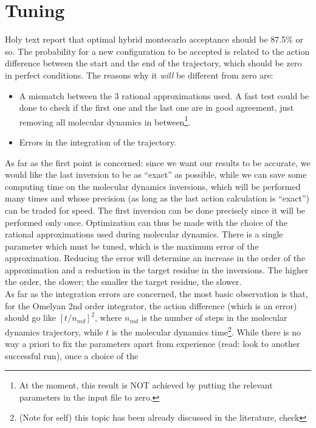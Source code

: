 \section{Tuning}
\label{tuning}
Holy text report that optimal hybrid montecarlo acceptance should be 87.5\% or 
so. 
The probability for a new configuration to be accepted is related to the action 
difference between the start and the end of the trajectory, which should be zero 
in 
perfect conditions. The reasons why it \emph{will} be different from zero are:
\begin{itemize}
    \item A mismatch between the 3 rational approximations used. A fast test could 
        be done 
        to check if the first one and the last one are in good agreement, just removing 
        all 
        molecular dynamics in between\footnote{At the moment, this result is NOT 
            achieved by 
        putting the relevant parameters in the input file to zero.}. 
    \item Errors in the integration of the trajectory.
\end{itemize}
As far as the first point is concerned: since we want our results to be 
accurate, we 
would like the last inversion to be as 
``exact'' as possible, while we can save some computing time on the molecular 
dynamics 
inversions, which will be performed many times and whose precision (as long as 
the last 
action calculation is ``exact'') can be traded for speed. The first inversion 
can be 
done precisely since it will be performed only once. Optimization can thus be 
made with
the choice of the rational approximations used during molecular dynamics. There 
is a 
single parameter which must be tuned, which is the maximum error of the 
approximation. 
Reducing the error will determine an increase in the order of the approximation 
and a 
reduction in the target residue in the inversions. The higher the order, the 
slower; 
the smaller the target residue, the slower. \\
As far as the integration errors are concerned, the most basic observation is 
that, for 
the Omelyan 2nd order integrator, the action difference (which is an error) 
should go 
like $[t/n_{md}]^2$, where $n_{md}$ is the number of steps in the molecular 
dynamics 
trajectory, while $t$ is the molecular dynamics time\footnote{(Note for self) 
this topic has been already discussed in 
    the 
literature, check}. While there is no way a priori to fix the parameters apart 
from 
experience (read: look to another successful run), once a choice of the 
